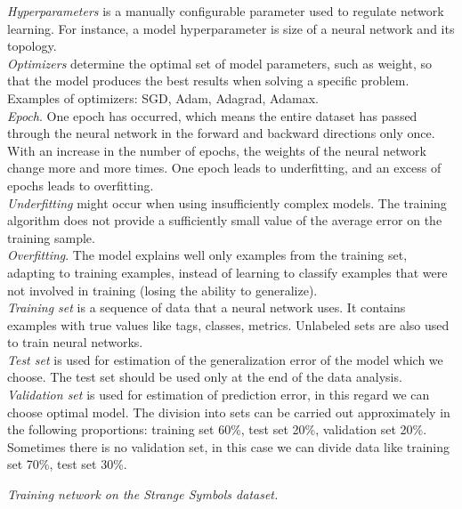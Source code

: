 \documentclass[a4paper, twoside, english]{article}
\begin{document}
\textit{Hyperparameters} is a manually configurable parameter used to regulate network learning. For instance, a model hyperparameter is size of a neural network and its topology.\\ 

\textit{Optimizers} determine the optimal set of model parameters, such as weight, so that the model produces the best results when solving a specific problem. Examples of optimizers: SGD, Adam, Adagrad, Adamax.\\ 

\textit{Epoch}. One epoch has occurred, which means the entire dataset has passed through the neural network in the forward and backward directions only once. With an increase in the number of epochs, the weights of the neural network change more and more times. One epoch leads to underfitting, and an excess of epochs leads to overfitting.\\ 

\textit{Underfitting} might occur when using insufficiently complex models. The training algorithm does not provide a sufficiently small value of the average error on the training sample.\\

\textit{Overfitting}. The model explains well only examples from the training set, adapting to training examples, instead of learning to classify examples that were not involved in training (losing the ability to generalize).\\

\textit{Training set} is a sequence of data that a neural network uses. It contains examples with true values like tags, classes, metrics. Unlabeled sets are also used to train neural networks.\\

\textit{Test set} is used for estimation of the generalization error of the model which we choose. The test set should be used only at the end of the data analysis.\\

\textit{Validation set} is used for estimation of prediction error, in this regard we can choose optimal model. The division into sets can be carried out approximately in the following proportions: training set 60\%, test set 20\%, validation set 20\%. Sometimes there is no validation set, in this case we can divide data like training set 70\%, test set 30\%.\\
\newpage

\textit{Training network on the Strange Symbols dataset.}\\
\end{document}
